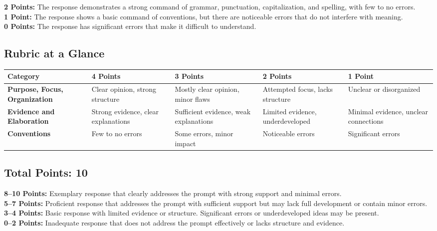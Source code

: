 \documentclass[12pt]{article}
\begin{document}
\begin{tcolorbox}[colframe=black!40, colback=gray!5, title=Conventions of Standard English (0--2 points)]
\textbf{2 Points:} The response demonstrates a strong command of grammar, punctuation, capitalization, and spelling, with few to no errors. \\
\textbf{1 Point:} The response shows a basic command of conventions, but there are noticeable errors that do not interfere with meaning. \\
\textbf{0 Points:} The response has significant errors that make it difficult to understand.
\end{tcolorbox}

\subsection*{Rubric at a Glance}
\begin{tcolorbox}[colframe=black!40, colback=white, title=Score Distribution]
\begin{tabular}{|p{4cm}|p{2cm}|p{2cm}|p{2cm}|p{2cm}|}
\hline
\textbf{Category} & \textbf{4 Points} & \textbf{3 Points} & \textbf{2 Points} & \textbf{1 Point} \\ \hline
\textbf{Purpose, Focus, Organization} & Clear opinion, strong structure & Mostly clear opinion, minor flaws & Attempted focus, lacks structure & Unclear or disorganized \\ \hline
\textbf{Evidence and Elaboration} & Strong evidence, clear explanations & Sufficient evidence, weak explanations & Limited evidence, underdeveloped & Minimal evidence, unclear connections \\ \hline
\textbf{Conventions} & Few to no errors & Some errors, minor impact & Noticeable errors & Significant errors \\ \hline
\end{tabular}
\end{tcolorbox}

\subsection*{Total Points: 10}
\begin{tcolorbox}[colframe=black!40, colback=white, title=Score Levels]
\textbf{8--10 Points:} Exemplary response that clearly addresses the prompt with strong support and minimal errors. \\
\textbf{5--7 Points:} Proficient response that addresses the prompt with sufficient support but may lack full development or contain minor errors. \\
\textbf{3--4 Points:} Basic response with limited evidence or structure. Significant errors or underdeveloped ideas may be present. \\
\textbf{0--2 Points:} Inadequate response that does not address the prompt effectively or lacks structure and evidence.
\end{tcolorbox}
\end{document}
